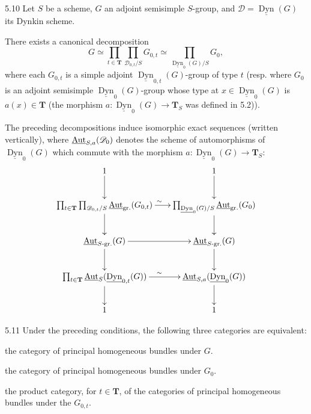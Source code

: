 \begin{proposition}{5.10}\label{XXIV.5.10}
Let $S$ be a scheme, $G$ an adjoint semisimple $S$-group, and $\mathscr D=\underline{\operatorname{Dyn}}(G)$ its Dynkin scheme.
\begin{enumeratei}
\item There exists a canonical decomposition
\[
G\simeq\prod_{t\in\mathbf T}\prod_{\mathscr D_{0,t}/S}G_{0,t}\simeq\prod_{\underline{\operatorname{Dyn}}_0(G)/S}G_0,
\]
where each $G_{0,t}$ is a simple adjoint $\underline{\operatorname{Dyn}}_{0,t}(G)$-group of type $t$ (resp. where $G_0$ is an adjoint semisimple $\underline{\operatorname{Dyn}}_0(G)$-group whose type at $x\in\underline{\operatorname{Dyn}}_0(G)$ is $a(x)\in\mathbf T$ (the morphism $a:\underline{\operatorname{Dyn}}_0(G)\to\mathbf T_S$ was defined in 5.2)).
\item The preceding decompositions induce isomorphic exact sequences (written vertically), where $\underline{\operatorname{Aut}}_{S,a}(\mathscr D_0)$ denotes the scheme of automorphisms of $\underline{\operatorname{Dyn}}_0(G)$ which commute with the morphism $a:\underline{\operatorname{Dyn}}_0(G)\to\mathbf T_S$:
\[
\xymatrix@C=1.8em{
1\ar[d]&1\ar[d]\\
\prod_{t\in\mathbf T}\prod_{\mathscr D_{0,t}/S}\underline{\Aut}_{\mathrm{gr.}}(G_{0,t})\ar[r]^{\sim}\ar[d]&\prod_{\underline{\operatorname{Dyn}}_0(G)/S}\underline{\Aut}_{\mathrm{gr.}}(G_0)\ar[d]\\
\underline{\Aut}_{S\text{-gr.}}(G)\ar[r]\ar[d]&\underline{\Aut}_{S\text{-gr.}}(G)\ar[d]\\
\prod_{t\in\mathbf T}\underline{\Aut}_S(\underline{\operatorname{Dyn}}_{0,t}(G))\ar[r]^{\sim}\ar[d]&\underline{\Aut}_{S,a}(\underline{\operatorname{Dyn}}_0(G))\ar[d]\\
1&1}
\]
\end{enumeratei}
\end{proposition}
\begin{corollary}{5.11}\label{XXIV.5.11}
Under the preceding conditions, the following three categories are equivalent:
\begin{enumeratei}
\item the category of principal homogeneous bundles under $G$.
\item the category of principal homogeneous bundles under $G_0$.
\item the product category, for $t\in\mathbf T$, of the categories of principal homogeneous bundles under the $G_{0,t}$.
\end{enumeratei}
\end{corollary}
